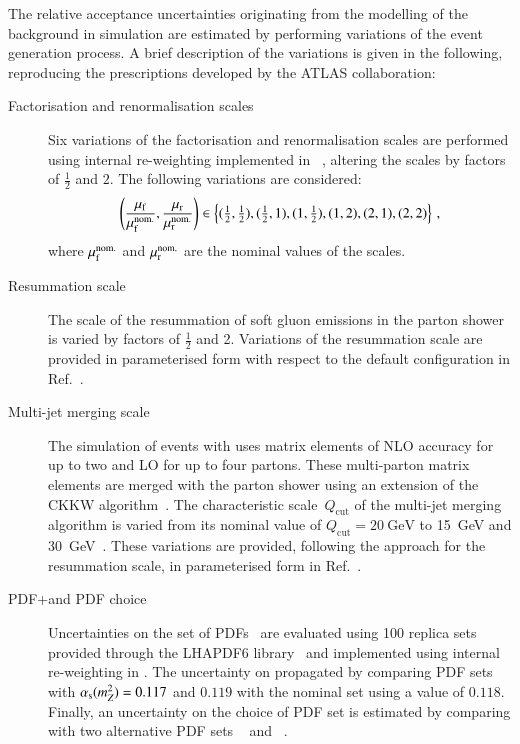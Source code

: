The relative acceptance uncertainties originating from the modelling of the \ZHF
background in simulation are estimated by performing variations of the event
generation process. A brief description of the variations is given in the
following, reproducing the prescriptions developed by the ATLAS
collaboration:
\begin{description}

\item[Factorisation and renormalisation scales] Six variations of the
  factorisation and renormalisation scales are performed using internal
  re-weighting implemented in \SHERPA[2.2.1]~\cite{Bothmann:2019yzt}, altering
  the scales by factors of $\frac{1}{2}$ and $2$. The following variations are
  considered:
  \begin{align*}
    \left( \frac{\mu_\mathrm{f}}{\mu_\mathrm{f}^{\text{nom.}}}, \frac{\mu_\mathrm{r}}{\mu_\mathrm{r}^{\text{nom.}}} \right) \in
    \left\{ (\tfrac{1}{2}, \tfrac{1}{2}), (\tfrac{1}{2}, 1), (1, \tfrac{1}{2}), (1, 2), (2, 1), (2, 2) \right\} \,\text{,}
  \end{align*}
  where $\mu_\mathrm{f}^{\text{nom.}}$ and $\mu_\mathrm{r}^{\text{nom.}}$ are the nominal values of
  the scales.

\item[Resummation scale] The scale of the resummation of soft gluon emissions in
  the \SHERPA parton shower is varied by factors of $\frac{1}{2}$ and
  2. Variations of the resummation scale are provided in parameterised form with
  respect to the default \SHERPA configuration in Ref.~\cite{anders:2017}.

\item[Multi-jet merging scale] The simulation of \Zjets events with
  \SHERPA[2.2.1] uses matrix elements of NLO accuracy for up to two and LO for
  up to four partons. These multi-parton matrix elements are merged with the
  parton shower using an extension of the CKKW
  algorithm~\cite{Catani:2001cc,Hoeche:2009rj,Hoeche:2012yf}. The characteristic
  scale~$Q_{\text{cut}}$ of the multi-jet merging algorithm is varied from its
  nominal value of $Q_{\text{cut}} = \SI{20}{\GeV}$ to \SI{15}{\GeV} and
  \SI{30}{\GeV}~\cite{anders:2017}. These variations are provided, following the
  approach for the resummation scale, in parameterised form in
  Ref.~\cite{anders:2017}.

\item[PDF+\alphas and PDF choice] Uncertainties on the \NNPDF[3.0nnlo] set of
  PDFs~\cite{Ball:2014uwa} are evaluated using 100 replica sets provided through
  the \textsc{LHAPDF6} library~\cite{Buckley:2014ana} and implemented using
  internal re-weighting in \SHERPA. The uncertainty on \alphas propagated by
  comparing \NNPDF[3.0nnlo] PDF sets with $\alpha_{\text{s}}(m_{Z}^2) = 0.117$ and $0.119$
  with the nominal set using a value of $0.118$. Finally, an uncertainty on the
  choice of PDF set is estimated by comparing with two alternative PDF sets
  \MMHT[nnlo68cl]~\cite{Harland-Lang:2014zoa} and
  \CT[14nnlo]~\cite{Dulat:2015mca}.


\end{description}
